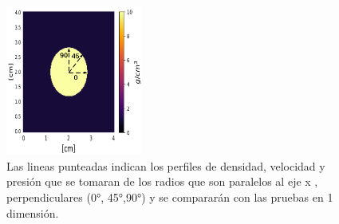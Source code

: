 \documentclass[12pt,a4paper]{book}
\begin{document}
\begin{figure}
  \centering
    \includegraphics[width=0.4\textwidth]{./Figuras/verificacion_del_codigo/pruebas_2D/Example.png}
  \caption{Las lineas punteadas indican los perfiles de densidad, velocidad y presión que se 
  tomaran de los radios que son 
  paralelos al eje x ,  perpendiculares (0°, 45°,90°) y se compararán con las pruebas en 
  1 dimensión.}\label{Example_blast_wave}
\end{figure}
\end{document}
